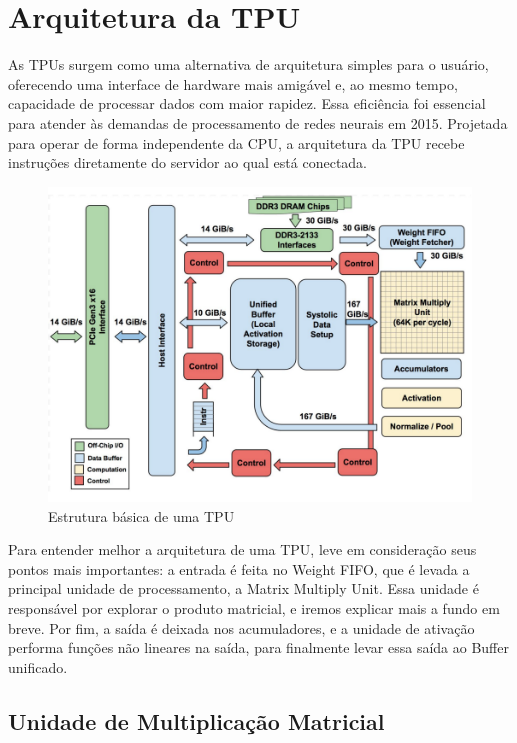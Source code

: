 \documentclass{report}
\begin{document}
\chapter{Arquitetura da TPU}

\setlength{\parskip}{1em}\hspace{0.5cm} As TPUs surgem como uma alternativa de arquitetura simples para o usuário, oferecendo uma interface de hardware mais amigável e, ao mesmo tempo, capacidade de processar dados com maior rapidez. Essa eficiência foi essencial para atender às demandas de processamento de redes neurais em 2015. Projetada para operar de forma independente da CPU, a arquitetura da TPU recebe instruções diretamente do servidor ao qual está conectada.

\begin{figure}[h]
	\includegraphics[scale=0.7]{tpu-block-diagram}
	\centering
	\caption{Estrutura básica de uma TPU}
\end{figure}

Para entender melhor a arquitetura de uma TPU, leve em consideração seus pontos mais importantes: a entrada é feita no Weight FIFO, que é levada a principal unidade de processamento, a Matrix Multiply Unit. Essa unidade é responsável por explorar o produto matricial, e iremos explicar mais a fundo em breve. Por fim, a saída é deixada nos acumuladores, e a unidade de ativação performa funções não lineares na saída, para finalmente levar essa saída ao Buffer unificado.

\section{Unidade de Multiplicação Matricial}
\end{document}
